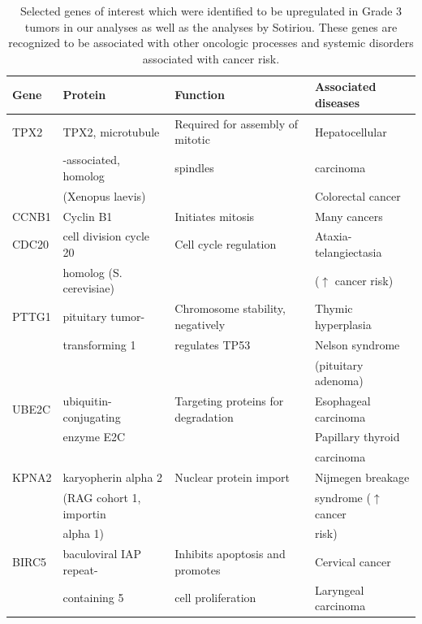 \documentclass[a4paper,10pt]{article}
\begin{document}
\begin{table}
\begin{tabular}{| l | l | l | l | }
    \hline
\textbf{Gene} & \textbf{Protein} & \textbf{Function} & \textbf{Associated diseases}\\ \hline 
TPX2 & TPX2, microtubule & Required for assembly of mitotic & Hepatocellular \\
 &  -associated, homolog  & spindles & carcinoma \\
 & (Xenopus laevis) &   &  Colorectal cancer
\\ \hline
CCNB1 & Cyclin B1 & Initiates mitosis & Many cancers\\ \hline 
CDC20 & cell division cycle 20 & Cell cycle regulation & Ataxia-telangiectasia \\
 & homolog (S. cerevisiae)  & &  ($\uparrow$ cancer risk) 
\\ \hline
PTTG1 & pituitary tumor- & Chromosome stability, negatively & Thymic hyperplasia\\
 & transforming 1 & regulates TP53 &  Nelson syndrome \\
 & & & (pituitary adenoma)
\\ \hline 
UBE2C & ubiquitin-conjugating & Targeting proteins for degradation & Esophageal carcinoma \\
 & enzyme E2C  & & Papillary thyroid \\
 & & & carcinoma
\\ \hline 
KPNA2 & karyopherin alpha 2 & Nuclear protein import & Nijmegen breakage \\
 & (RAG cohort 1, importin & & syndrome ($\uparrow$ cancer \\
 & alpha 1) &  &   risk) 
\\ \hline 
BIRC5 & baculoviral IAP repeat- &  Inhibits apoptosis and promotes & Cervical cancer \\
 & containing 5 & cell proliferation &  Laryngeal carcinoma
\\ \hline
\end{tabular}
\caption{Selected genes of interest which were identified to be upregulated in 
Grade 3 tumors in our analyses as well as the analyses by Sotiriou.  
These genes are recognized to be associated with other oncologic 
processes and systemic disorders associated with cancer risk.}\label{T3}
\end{table}
\end{document}
